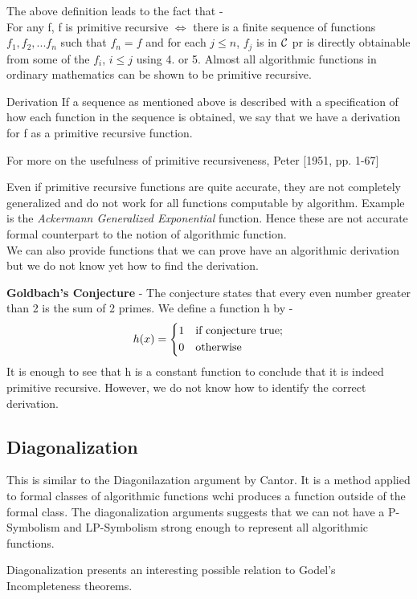 \documentclass[openany]{book}
\begin{document}
\begin{mynote}
    The above definition leads to the fact that - \\
    For any f, f is primitive recursive $\iff$ there is a finite sequence of functions $f_1, f_2, ... f_n$ such that $f_n = f$ and for each $j\leq n$, $f_j$ is in $\mathcal{C}$ pr is directly obtainable from some of the $f_i$, $i \leq j$ using 4. or 5. 
    Almost all algorithmic functions in ordinary mathematics can be shown to be primitive recursive. 
\end{mynote}
\begin{mydefinition}{Derivation}
    If a sequence as mentioned above is described with a specification of how each function in the sequence is obtained, we say that we have a derivation for f as a primitive recursive function. 
\end{mydefinition}
\begin{mynote}
    For more on the usefulness of primitive recursiveness, Peter [1951, pp. 1-67]
\end{mynote}
Even if primitive recursive functions are quite accurate, they are not completely generalized and do not work for all functions computable by algorithm. Example is the \textit{Ackermann Generalized Exponential} function. Hence these are not accurate formal counterpart to the notion of algorithmic function. \\ 
We can also provide functions that we can prove have an algorithmic derivation but we do not know yet how to find the derivation. \\
\begin{example}
    \textbf{Goldbach's Conjecture} - The conjecture states that every even number greater than 2 is the sum of 2 primes. We define a function h by - 
    $$h(x) = \begin{dcases}
        1 & \text{if conjecture true;} \\
        0 & \text{otherwise} \\
    \end{dcases}$$
    It is enough to see that h is a constant function to conclude that it is indeed primitive recursive. However, we do not know how to identify the correct derivation. 
\end{example}
\subsection{Diagonalization}
This is similar to the Diagonilazation argument by Cantor. It is a method applied to formal classes of algorithmic functions wchi produces a function outside of the formal class. The diagonalization arguments suggests that we can not have a P-Symbolism and LP-Symbolism strong enough to represent all algorithmic functions. 
\begin{mynote}
    Diagonalization presents an interesting possible relation to Godel's Incompleteness theorems.
\end{mynote}
\end{document}
